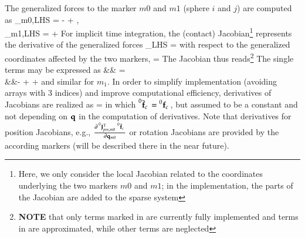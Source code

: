 The generalized forces to the marker $m0$ and $m1$ (sphere $i$ and $j$) are computed as
\bea
  \fv_{m0,LHS} = -  + 
                  , \nonumber \\
  \fv_{m1,LHS} =   + 
                   \eqDot
\eea
%
%
For implicit time integration, the (contact) Jacobian\footnote{Here, we only consider the local Jacobian related to the coordinates underlying the two markers $m0$ and $m1$; in the implementation, the parts of the Jacobian are added to the sparse system } represents the derivative of the generalized forces 
\be
  \fv_{LHS} = 
\ee
with respect to the generalized coordinates affected by the two markers,
\be
  \qv =  \eqDot
\ee
The Jacobian thus reads\footnote{{\bf NOTE} that only terms marked in {\bf{}} are currently fully implemented and terms in {\bf{}} are approximated, while other terms are neglected}
\be
\ee
The single terms may be expressed as
\bea
  && = \nonumber \\
  &&- 
   
  + 
  + 
  \eqComma
\eea
and similar for $m_1$.
In order to simplify implementation (avoiding arrays with 3 indices) and improve computational efficiency, 
derivatives of Jacobians are realized as
\be
    = 
  \eqComma
\ee
in which $\prescript{0}{}{\bar {\mathbf{f}}_c}\, = \prescript{0}{}{\mathbf{f}_c}\,$, but assumed to be a constant and not depending on $\mathbf{q}$ in the computation of derivatives.
Note that derivatives for position Jacobians, e.g., $\frac{\partial \prescript{0}{}{\mathbf{J}_{pos,m0}^\mathrm{T}}\, \prescript{0}{}{\bar {\mathbf{f}}_c}\,}{\partial \mathbf{q}_{m0}}$ or rotation
Jacobians are provided by the according markers (will be described there in the near future).

